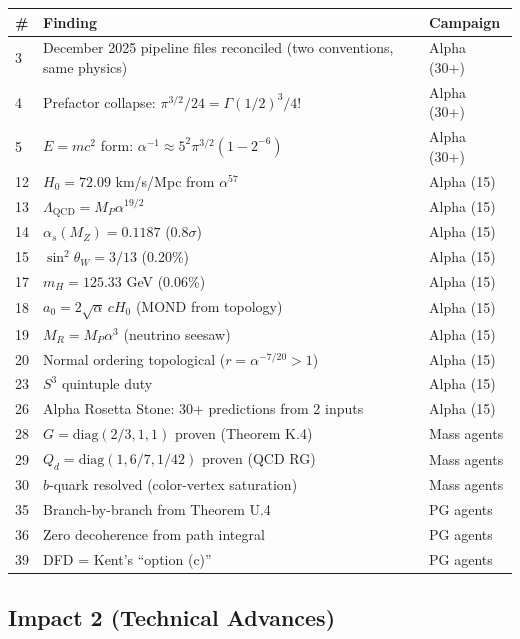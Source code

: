 \documentclass[11pt,a4paper]{article}
\begin{document}
\begin{longtable}{@{}p{0.7cm}p{12cm}l@{}}
\toprule
\# & Finding & Campaign \\
\midrule
3 & December 2025 pipeline files reconciled (two conventions, same physics) & Alpha (30+) \\
4 & Prefactor collapse: $\pi^{3/2}/24 = \Gamma(1/2)^3/4!$ & Alpha (30+) \\
5 & $E = mc^2$ form: $\alpha^{-1} \approx 5^2\pi^{3/2}(1-2^{-6})$ & Alpha (30+) \\
12 & $H_0 = 72.09$ km/s/Mpc from $\alpha^{57}$ & Alpha (15) \\
13 & $\Lambda_{\mathrm{QCD}} = M_P\alpha^{19/2}$ & Alpha (15) \\
14 & $\alpha_s(M_Z) = 0.1187$ ($0.8\sigma$) & Alpha (15) \\
15 & $\sin^2\theta_W = 3/13$ (0.20\%) & Alpha (15) \\
17 & $m_H = 125.33$ GeV (0.06\%) & Alpha (15) \\
18 & $a_0 = 2\sqrt{\alpha}\,cH_0$ (MOND from topology) & Alpha (15) \\
19 & $M_R = M_P\alpha^3$ (neutrino seesaw) & Alpha (15) \\
20 & Normal ordering topological ($r = \alpha^{-7/20} > 1$) & Alpha (15) \\
23 & $S^3$ quintuple duty & Alpha (15) \\
26 & Alpha Rosetta Stone: 30+ predictions from 2 inputs & Alpha (15) \\
28 & $G = \mathrm{diag}(2/3,1,1)$ proven (Theorem K.4) & Mass agents \\
29 & $Q_d = \mathrm{diag}(1, 6/7, 1/42)$ proven (QCD RG) & Mass agents \\
30 & $b$-quark resolved (color-vertex saturation) & Mass agents \\
35 & Branch-by-branch from Theorem U.4 & PG agents \\
36 & Zero decoherence from path integral & PG agents \\
39 & DFD = Kent's ``option (c)'' & PG agents \\
\bottomrule
\end{longtable}


\subsection{Impact 2 (Technical Advances)}
\end{document}
